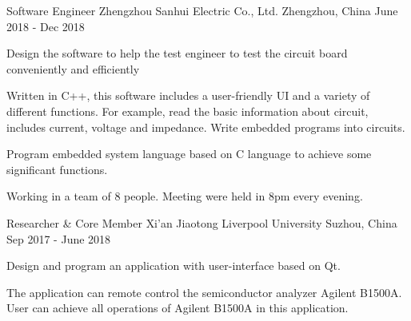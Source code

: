\begin{cventries}
  \cventry
    {Software Engineer} %
    {Zhengzhou Sanhui Electric Co., Ltd.} %
    {Zhengzhou, China} %
    {June 2018 - Dec 2018} %
    {
      \begin{cvitems} %
        \item {Design the software to help the test engineer to test the circuit board conveniently and efficiently}
        \item {Written in C++, this software includes a user-friendly UI and a variety of different functions. For example, read the basic information about circuit, includes current, voltage and impedance. Write embedded programs into circuits.}
        \item {Program embedded system language based on C language to achieve some significant functions.}
        \item{Working in a team of 8 people. Meeting were held in 8pm every evening.}
      \end{cvitems}
    }



  \cventry
    {Researcher \& Core Member} %
    {Xi’an Jiaotong Liverpool University} %
    {Suzhou, China} %
    {Sep 2017 - June 2018} %
    {
      \begin{cvitems} %
        \item {Design and program an application with user-interface based on Qt.}
        \item {The application can remote control the semiconductor analyzer Agilent B1500A. User can achieve all operations of Agilent B1500A in this application.}
      \end{cvitems}
    }




\end{cventries}
